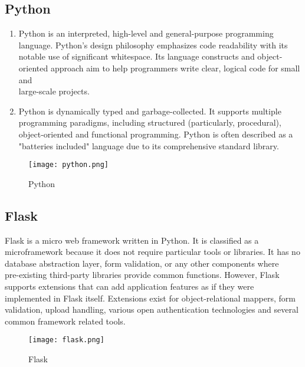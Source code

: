 \subsection{Python}
\begin{enumerate}
\item Python is an interpreted, high-level and general-purpose programming \\language. Python's design philosophy emphasizes code readability with its \\notable use of significant whitespace. Its language constructs and object-oriented approach aim to help programmers write clear, logical code for small and \\large-scale projects.
\item Python is dynamically typed and garbage-collected. It supports multiple \\programming paradigms, including structured (particularly, procedural), \\object-oriented and functional programming. Python is often described as a "batteries included" language due to its comprehensive standard library.
\end{enumerate}
\begin{figure}[h]
\centering
\texttt{[image: python.png]}
\caption{Python}
\end{figure}
\newpage
\subsection{Flask}
Flask is a micro web framework written in Python. It is classified as a \\microframework because it does not require particular tools or libraries. It has no database abstraction layer, form validation, or any other components where \\pre-existing third-party libraries provide common functions. However, Flask \\supports extensions that can add application features as if they were implemented in Flask itself. Extensions exist for object-relational mappers, form validation, upload handling, various open authentication technologies and several common framework related tools.
\begin{figure}[h]
\centering
\texttt{[image: flask.png]}
\caption{Flask}
\end{figure}